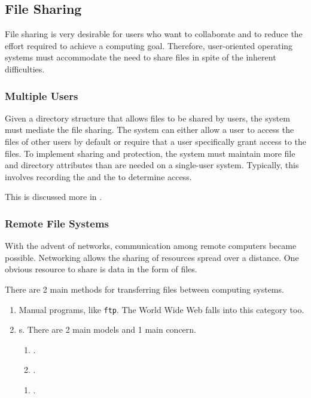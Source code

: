 \subsection{File Sharing}\label{subsec:File_Sharing}
File sharing is very desirable for users who want to collaborate and to reduce the effort required to achieve a computing goal.
Therefore, user-oriented operating systems must accommodate the need to share files in spite of the inherent difficulties.

\subsubsection{Multiple Users}\label{subsubsec:File_Sharing-Multiple_Users}
Given a directory structure that allows files to be shared by users, the system must mediate the file sharing.
The system can either allow a user to access the files of other users by default or require that a user specifically grant access to the files.
To implement sharing and protection, the system must maintain more file and directory attributes than are needed on a single-user system.
Typically, this involves recording the  and the  to determine access.

This is discussed more in .

\subsubsection{Remote File Systems}\label{subsubsec:Remote_File_Systems}
With the advent of networks, communication among remote computers became possible.
Networking allows the sharing of resources spread over a distance.
One obvious resource to share is data in the form of files.

There are 2 main methods for transferring files between computing systems.
\begin{enumerate}[noitemsep]
\item Manual programs, like \texttt{ftp}. The World Wide Web falls into this category too.
\item {}s. There are 2 main models and 1 main concern.
  \begin{enumerate}[noitemsep]
  \item {}.
  \item {}.
  \end{enumerate}
  \begin{enumerate}[noitemsep]
  \item {}.
  \end{enumerate}
\end{enumerate}


